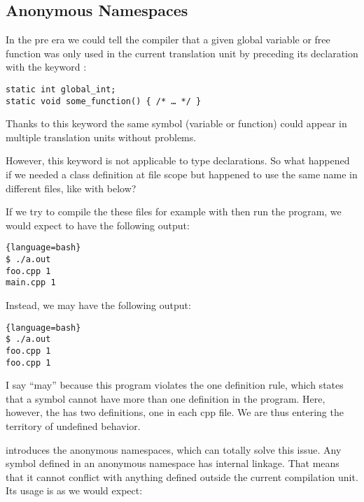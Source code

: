 \subsection{Anonymous Namespaces}

In the pre  era we could tell the compiler that a given global
variable or free function was only used in the current translation
unit by preceding its declaration with the keyword :

\begin{lstlisting}
static int global_int;
static void some_function() { /* … */ }
\end{lstlisting}

Thanks to this keyword the same symbol (variable or function) could
appear in multiple translation units without problems.

However, this keyword is not applicable to type declarations. So what
happened if we needed a class definition at file scope but happened to
use the same name in different files, like with 
below?




If we try to compile the these files for example with  then run the program, we would expect to have the
following output:

\begin{lstlisting}{language=bash}
$ ./a.out
foo.cpp 1
main.cpp 1
\end{lstlisting}

Instead, we may have the following output:

\begin{lstlisting}{language=bash}
$ ./a.out
foo.cpp 1
foo.cpp 1
\end{lstlisting}

I say ``may'' because this program violates the one definition rule,
which states that a symbol cannot have more than one definition in the
program. Here, however, the  has two definitions, one
in each cpp file. We are thus entering the territory of undefined
behavior.

\bigskip

 introduces the anonymous namespaces, which can totally solve
this issue. Any symbol defined in an anonymous namespace has internal
linkage. That means that it cannot conflict with anything defined
outside the current compilation unit. Its usage is as we would expect:

